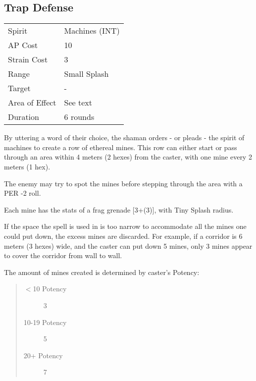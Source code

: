 \documentclass[11pt,a4paper,twocolumn]{book}
\begin{document}
\subsection*{Trap Defense}
{
	\begin{tabu} to 70mm{| X[l,4] | X[l,7] |}
		\hline
		Spirit         & Machines (INT) \\
		AP Cost        & 10             \\
		Strain Cost    & 3              \\
		Range          & Small Splash   \\
		Target         & -              \\
		Area of Effect & See text       \\
		Duration       & 6 rounds       \\ \hline
	\end{tabu}
	
}
\smallskip

By uttering a word of their choice, the shaman orders - or pleads - the spirit of machines to create a row of ethereal mines. This row can either start or pass through an area within 4 meters (2 hexes) from the caster, with one mine every 2 meters (1 hex).

The enemy may try to spot the mines before stepping through the area with a PER -2 roll.

Each mine has the stats of a frag grenade [3+(3)], with Tiny Splash radius.

If the space the spell is used in is too narrow to accommodate all the mines one could put down, the excess mines are discarded. For example, if a corridor is 6 meters (3 hexes) wide, and the caster can put down 5 mines, only 3 mines appear to cover the corridor from wall to wall.

The amount of mines created is determined by caster's Potency:
\begin{quote}
	\begin{description}
		\item[$<$10 Potency] 	3
		\item[10-19 Potency] 	5
		\item[20+ Potency] 		7
	\end{description}	
\end{quote}
\end{document}
